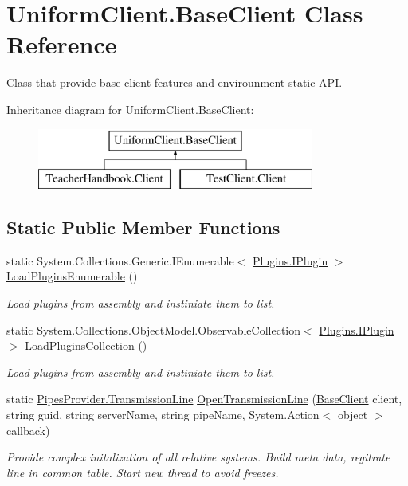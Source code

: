 \hypertarget{class_uniform_client_1_1_base_client}{}\section{Uniform\+Client.\+Base\+Client Class Reference}
\label{class_uniform_client_1_1_base_client}


Class that provide base client features and envirounment static A\+PI.  


Inheritance diagram for Uniform\+Client.\+Base\+Client\+:\begin{figure}[H]
\begin{center}
\leavevmode
\includegraphics[height=2.000000cm]{d4/deb/class_uniform_client_1_1_base_client}
\end{center}
\end{figure}
\subsection*{Static Public Member Functions}
\begin{DoxyCompactItemize}
\item 
static System.\+Collections.\+Generic.\+I\+Enumerable$<$ \mbox{\hyperlink{interface_uniform_client_1_1_plugins_1_1_i_plugin}{Plugins.\+I\+Plugin}} $>$ \mbox{\hyperlink{class_uniform_client_1_1_base_client_aa60dbfa5bd8c46659aec7738193315f1}{Load\+Plugins\+Enumerable}} ()
\begin{DoxyCompactList}\small\item\em Load plugins from assembly and instiniate them to list. \end{DoxyCompactList}\item 
static System.\+Collections.\+Object\+Model.\+Observable\+Collection$<$ \mbox{\hyperlink{interface_uniform_client_1_1_plugins_1_1_i_plugin}{Plugins.\+I\+Plugin}} $>$ \mbox{\hyperlink{class_uniform_client_1_1_base_client_a99ae0bb1dd5bef374fcedb3f873bfe8b}{Load\+Plugins\+Collection}} ()
\begin{DoxyCompactList}\small\item\em Load plugins from assembly and instiniate them to list. \end{DoxyCompactList}\item 
static \mbox{\hyperlink{class_pipes_provider_1_1_transmission_line}{Pipes\+Provider.\+Transmission\+Line}} \mbox{\hyperlink{class_uniform_client_1_1_base_client_a3b09387a94e46bf9365ee603202ba488}{Open\+Transmission\+Line}} (\mbox{\hyperlink{class_uniform_client_1_1_base_client}{Base\+Client}} client, string guid, string server\+Name, string pipe\+Name, System.\+Action$<$ object $>$ callback)
\begin{DoxyCompactList}\small\item\em Provide complex initalization of all relative systems. Build meta data, regitrate line in common table. Start new thread to avoid freezes. \end{DoxyCompactList}\end{DoxyCompactItemize}
